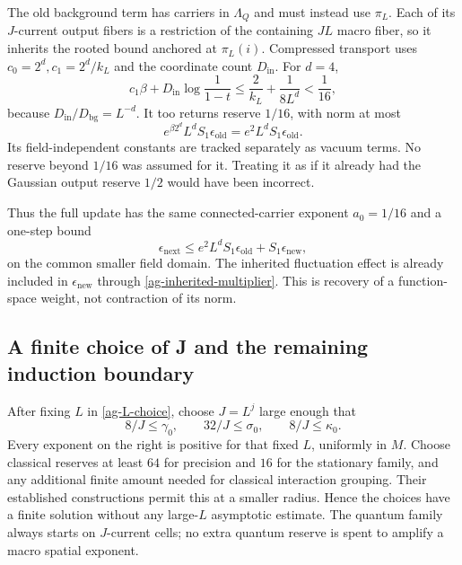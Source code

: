 The old background term has carriers in $\Lambda_Q$ and
must instead use $\pi_L$. Each of its $J$-current output
fibers is a restriction of the containing $JL$ macro fiber,
so it inherits the rooted bound anchored at $\pi_L(i)$.
Compressed transport uses $c_0=2^d,c_1=2^d/k_L$ and
the coordinate count $D_{\mathrm{in}}$. For $d=4$,
\begin{equation}\label{ag-old-transport-budget}
 c_1\beta+D_{\mathrm{in}}\log\frac1{1-t}
 \le\frac2{k_L}+\frac1{8L^d}<\frac1{16},
\end{equation}
because $D_{\mathrm{in}}/D_{\mathrm{bg}}=L^{-d}$.
It too returns reserve $1/16$, with norm at most
\begin{equation}\label{ag-old-transport}
 e^{\beta2^d}L^d S_1\epsilon_{\mathrm{old}}
       =e^2L^d S_1\epsilon_{\mathrm{old}}.
\end{equation}
Its field-independent constants are tracked separately as
vacuum terms. No reserve beyond $1/16$ was assumed for it.
Treating it as if it already had the Gaussian output reserve
$1/2$ would have been incorrect.

Thus the full update has the same connected-carrier exponent
$a_0=1/16$ and a one-step bound
\begin{equation}\label{ag-weight-recurrence}
 \epsilon_{\mathrm{next}}
 \le e^2L^dS_1\epsilon_{\mathrm{old}}
                     +S_1\epsilon_{\mathrm{new}},
\end{equation}
on the common smaller field domain. The inherited
fluctuation effect is already included in
$\epsilon_{\mathrm{new}}$ through
\eqref{ag-inherited-multiplier}. This is recovery of a
function-space weight, not contraction of its norm.

\subsection{A finite choice of J and the remaining induction boundary}

After fixing $L$ in \eqref{ag-L-choice}, choose $J=L^j$
large enough that
\begin{equation}\label{ag-J-choice}
 8/J\le\gamma_0,\qquad32/J\le\sigma_0,\qquad
 8/J\le\kappa_0.
\end{equation}
Every exponent on the right is positive for that fixed $L$,
uniformly in $M$. Choose classical reserves at least $64$
for precision and $16$ for the stationary family, and any
additional finite amount needed for classical interaction
grouping. Their established constructions permit this at
a smaller radius. Hence the choices have a finite solution
without any large-$L$ asymptotic estimate. The quantum
family always starts on $J$-current cells; no extra quantum
reserve is spent to amplify a macro spatial exponent.

